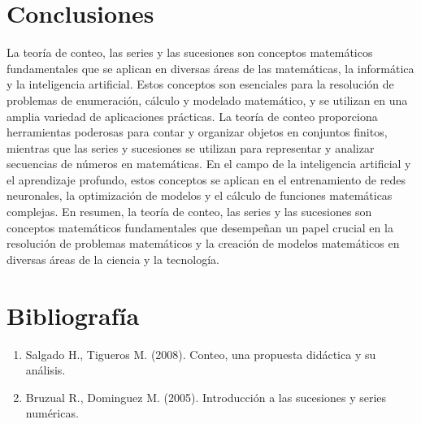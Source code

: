 \documentclass[11pt, a4paper]{article}
\begin{document}
\newpage

\section{Conclusiones}

La teoría de conteo, las series y las sucesiones son conceptos matemáticos fundamentales que se aplican en diversas áreas de las matemáticas, la informática y la inteligencia artificial. Estos conceptos son esenciales para la resolución de problemas de enumeración, cálculo y modelado matemático, y se utilizan en una amplia variedad de aplicaciones prácticas. La teoría de conteo proporciona herramientas poderosas para contar y organizar objetos en conjuntos finitos, mientras que las series y sucesiones se utilizan para representar y analizar secuencias de números en matemáticas. En el campo de la inteligencia artificial y el aprendizaje profundo, estos conceptos se aplican en el entrenamiento de redes neuronales, la optimización de modelos y el cálculo de funciones matemáticas complejas. En resumen, la teoría de conteo, las series y las sucesiones son conceptos matemáticos fundamentales que desempeñan un papel crucial en la resolución de problemas matemáticos y la creación de modelos matemáticos en diversas áreas de la ciencia y la tecnología.

\section{Bibliografía}

\begin{enumerate}[label=6.\arabic*]
  \item Salgado H., Tigueros M. (2008). Conteo, una propuesta didáctica y su análisis.
  \item Bruzual R., Dominguez M. (2005). Introducción a las sucesiones y series numéricas.  
\end{enumerate}
\end{document}
